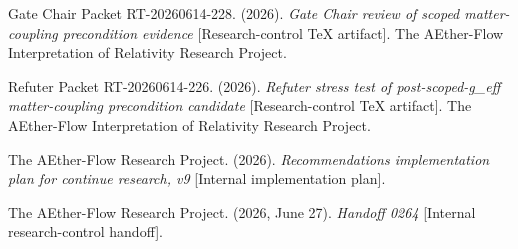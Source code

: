 \documentclass[11pt]{article}
\begin{document}
Gate Chair Packet RT-20260614-228. (2026). \textit{Gate Chair review of
scoped matter-coupling precondition evidence} [Research-control TeX artifact].
The AEther-Flow Interpretation of Relativity Research Project.

Refuter Packet RT-20260614-226. (2026). \textit{Refuter stress test of
post-scoped-g\_eff matter-coupling precondition candidate}
[Research-control TeX artifact]. The AEther-Flow Interpretation of Relativity
Research Project.

The AEther-Flow Research Project. (2026). \textit{Recommendations
implementation plan for continue research, v9} [Internal implementation plan].

The AEther-Flow Research Project. (2026, June 27). \textit{Handoff 0264}
[Internal research-control handoff].
\end{document}

